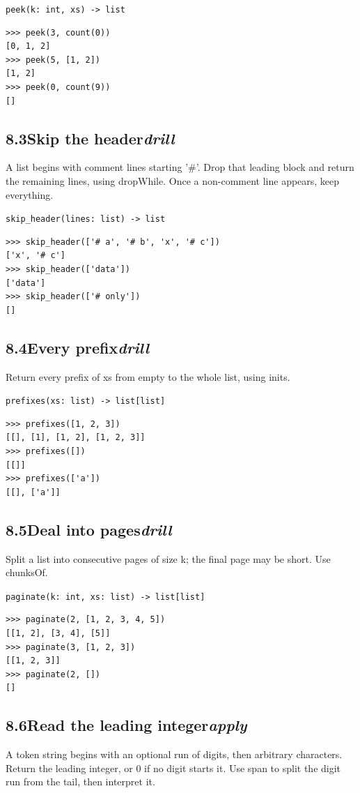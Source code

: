 \documentclass[10pt,letterpaper]{book}
\begin{document}
\noindent\texttt{peek(k: int, xs) -> list}
\begin{lstlisting}[style=ex]
>>> peek(3, count(0))
[0, 1, 2]
>>> peek(5, [1, 2])
[1, 2]
>>> peek(0, count(9))
[]
\end{lstlisting}
\subsection*{8.3\quad Skip the header\hfill\textnormal{\textit{drill}}}
A list begins with comment lines starting '\#'. Drop that leading block and return the remaining lines, using dropWhile. Once a non-comment line appears, keep everything.

\noindent\texttt{skip\_header(lines: list) -> list}
\begin{lstlisting}[style=ex]
>>> skip_header(['# a', '# b', 'x', '# c'])
['x', '# c']
>>> skip_header(['data'])
['data']
>>> skip_header(['# only'])
[]
\end{lstlisting}

\subsection*{8.4\quad Every prefix\hfill\textnormal{\textit{drill}}}
Return every prefix of xs from empty to the whole list, using inits.

\noindent\texttt{prefixes(xs: list) -> list[list]}
\begin{lstlisting}[style=ex]
>>> prefixes([1, 2, 3])
[[], [1], [1, 2], [1, 2, 3]]
>>> prefixes([])
[[]]
>>> prefixes(['a'])
[[], ['a']]
\end{lstlisting}
\subsection*{8.5\quad Deal into pages\hfill\textnormal{\textit{drill}}}
Split a list into consecutive pages of size k; the final page may be short. Use chunksOf.

\noindent\texttt{paginate(k: int, xs: list) -> list[list]}
\begin{lstlisting}[style=ex]
>>> paginate(2, [1, 2, 3, 4, 5])
[[1, 2], [3, 4], [5]]
>>> paginate(3, [1, 2, 3])
[[1, 2, 3]]
>>> paginate(2, [])
[]
\end{lstlisting}
\subsection*{8.6\quad Read the leading integer\hfill\textnormal{\textit{apply}}}
A token string begins with an optional run of digits, then arbitrary characters. Return the leading integer, or 0 if no digit starts it. Use span to split the digit run from the tail, then interpret it.
\end{document}
